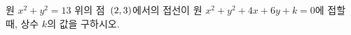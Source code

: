 원 $x^2+y^2=13$ 위의 점~$(2{,}\mkern3mu\mathopen{}3)$에서의 접선이 원 $x^2+y^2+4x+6y+k=0$에 접할 때, 상수 $k$의 값을 구하시오.
